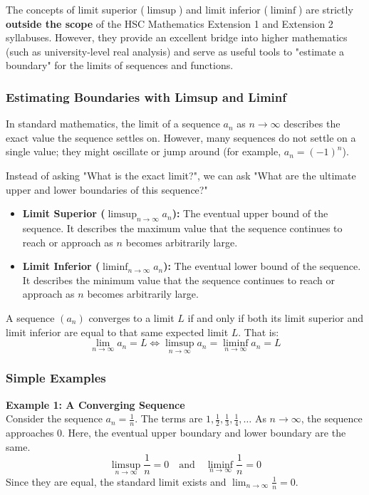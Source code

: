 \begin{tcolorbox}[colback=blue!5!white,colframe=blue!75!black,title=Note on Syllabus]
The concepts of limit superior ($\limsup$) and limit inferior ($\liminf$) are strictly \textbf{outside the scope} of the HSC Mathematics Extension 1 and Extension 2 syllabuses. However, they provide an excellent bridge into higher mathematics (such as university-level real analysis) and serve as useful tools to "estimate a boundary" for the limits of sequences and functions.
\end{tcolorbox}

\subsubsection*{Estimating Boundaries with Limsup and Liminf}
In standard mathematics, the limit of a sequence $a_n$ as $n \to \infty$ describes the exact value the sequence settles on. However, many sequences do not settle on a single value; they might oscillate or jump around (for example, $a_n = (-1)^n$). 

Instead of asking "What is the exact limit?", we can ask "What are the ultimate upper and lower boundaries of this sequence?"
\begin{itemize}
    \item \textbf{Limit Superior ($\limsup_{n \to \infty} a_n$):} The eventual upper bound of the sequence. It describes the maximum value that the sequence continues to reach or approach as $n$ becomes arbitrarily large.
    \item \textbf{Limit Inferior ($\liminf_{n \to \infty} a_n$):} The eventual lower bound of the sequence. It describes the minimum value that the sequence continues to reach or approach as $n$ becomes arbitrarily large.
\end{itemize}

A sequence $(a_n)$ converges to a limit $L$ if and only if both its limit superior and limit inferior are equal to that same expected limit $L$. That is:
\[ \lim_{n \to \infty} a_n = L \iff \limsup_{n \to \infty} a_n = \liminf_{n \to \infty} a_n = L \]

\subsubsection*{Simple Examples}

\textbf{Example 1: A Converging Sequence}\\
Consider the sequence $a_n = \frac{1}{n}$.
The terms are $1, \frac{1}{2}, \frac{1}{3}, \frac{1}{4}, \ldots$
As $n \to \infty$, the sequence approaches $0$.
Here, the eventual upper boundary and lower boundary are the same.
\[ \limsup_{n \to \infty} \frac{1}{n} = 0 \quad \text{and} \quad \liminf_{n \to \infty} \frac{1}{n} = 0 \]
Since they are equal, the standard limit exists and $\lim_{n \to \infty} \frac{1}{n} = 0$.

